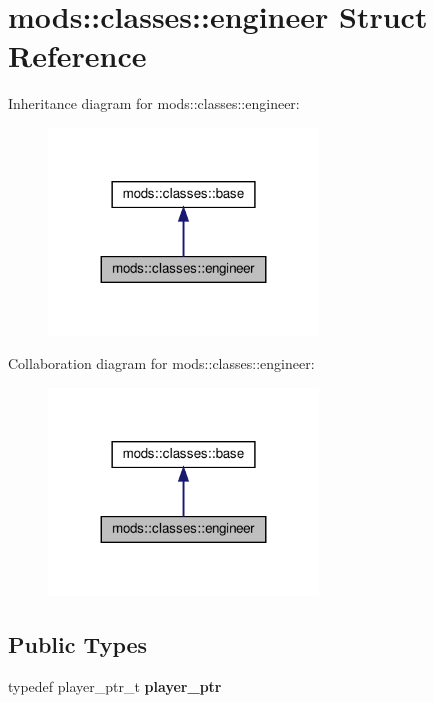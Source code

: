 \hypertarget{structmods_1_1classes_1_1engineer}{}\section{mods\+:\+:classes\+:\+:engineer Struct Reference}
\label{structmods_1_1classes_1_1engineer}


Inheritance diagram for mods\+:\+:classes\+:\+:engineer\+:
\nopagebreak
\begin{figure}[H]
\begin{center}
\leavevmode
\includegraphics[width=203pt]{structmods_1_1classes_1_1engineer__inherit__graph}
\end{center}
\end{figure}


Collaboration diagram for mods\+:\+:classes\+:\+:engineer\+:
\nopagebreak
\begin{figure}[H]
\begin{center}
\leavevmode
\includegraphics[width=203pt]{structmods_1_1classes_1_1engineer__coll__graph}
\end{center}
\end{figure}
\subsection*{Public Types}
\begin{DoxyCompactItemize}
\item 
\mbox{\label{structmods_1_1classes_1_1engineer_a4fd6b6629da4f29eb10527d8e653730d}} 
typedef player\+\_\+ptr\+\_\+t {\bfseries player\+\_\+ptr}
\end{DoxyCompactItemize}
